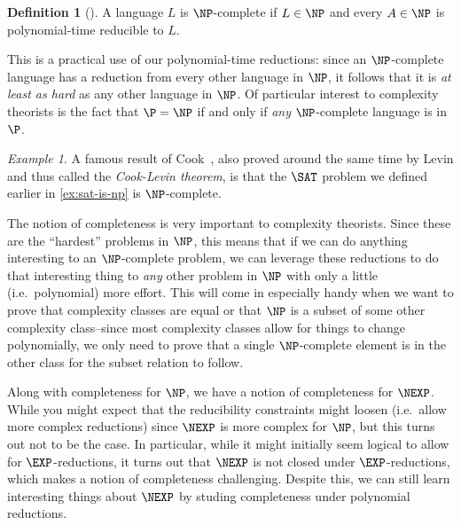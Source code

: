 \documentclass[english,12pt]{reedthesis}
\theoremstyle{plain}
\theoremstyle{definition}
\newtheorem{defn}[defn]{Definition}
\theoremstyle{remark}
\newtheorem{example}{Example}[thm]
\begin{document}
\begin{defn}[{\cite[Def.\ 7.34]{Sip97}}]\label{def:np-complete}
  A language $L$ is $\NP$-complete if $L \in \NP$ and every $A \in \NP$ is
  polynomial-time reducible to $L$.
\end{defn}

This is a practical use of our polynomial-time reductions: since an
$\NP$-complete language has a reduction from every other language in $\NP$, it
follows that it is \emph{at least as hard} as any other language in $\NP$. Of
particular interest to complexity theorists is the fact that $\P = \NP$ if and
only if \emph{any} $\NP$-complete language is in $\P$.

\begin{example}\label{ex:sat-is-complete}
  A famous result of Cook~\cite{Cook71}, also proved around the same time by
  Levin and thus called the \emph{Cook-Levin theorem}, is that the $\SAT$
  problem we defined earlier in \cref{ex:sat-is-np} is $\NP$-complete.
\end{example}

The notion of completeness is very important to complexity theorists. Since
these are the ``hardest'' problems in $\NP$, this means that if we can do
anything interesting to an $\NP$-complete problem, we can leverage these
reductions to do that interesting thing to \emph{any} other problem in $\NP$
with only a little (i.e.\ polynomial) more effort. This will come in especially
handy when we want to prove that complexity classes are equal or that $\NP$ is a
subset of some other complexity class--since most complexity classes allow for
things to change polynomially, we only need to prove that a single
$\NP$-complete element is in the other class for the subset relation to follow.

Along with completeness for $\NP$, we have a notion of completeness for $\NEXP$.
While you might expect that the reducibility constraints might loosen (i.e.\
allow more complex reductions) since $\NEXP$ is more complex for $\NP$, but this
turns out not to be the case. In particular, while it might initially seem
logical to allow for $\EXP$-reductions, it turns out that $\NEXP$ is not closed
under $\EXP$-reductions, which makes a notion of completeness challenging.
Despite this, we can still learn interesting things about $\NEXP$ by studing
completeness under polynomial reductions.
\end{document}
